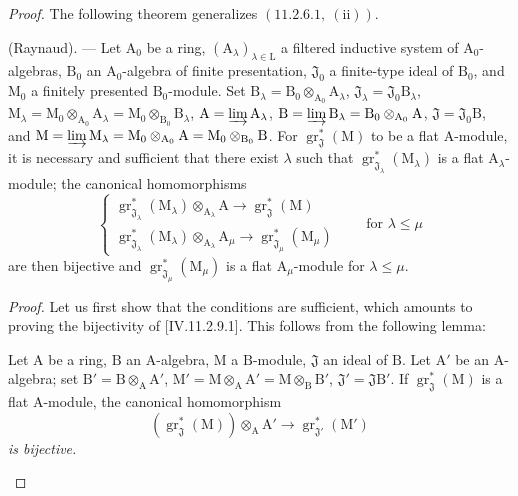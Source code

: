 \begin{proof}
The following theorem generalizes $(11.2.6.1,~(\mathrm{ii}))$.

\begin{theorem}[11.2.9]
\label{IV.11.2.9}
(Raynaud). --- Let $\mathrm{A}_0$ be a ring, $(\mathrm{A}_\lambda)_{\lambda\in\mathrm{L}}$ a filtered inductive system of $\mathrm{A}_0$-algebras, $\mathrm{B}_0$ an $\mathrm{A}_0$-algebra of finite presentation, $\mathfrak{J}_0$ a finite-type ideal of $\mathrm{B}_0$, and $\mathrm{M}_0$ a finitely presented $\mathrm{B}_0$-module. Set $\mathrm{B}_\lambda=\mathrm{B}_0\otimes_{\mathrm{A}_0}\mathrm{A}_\lambda$, $\mathfrak{J}_\lambda=\mathfrak{J}_0\mathrm{B}_\lambda$, $\mathrm{M}_\lambda=\mathrm{M}_0\otimes_{\mathrm{A}_0}\mathrm{A}_\lambda=\mathrm{M}_0\otimes_{\mathrm{B}_0}\mathrm{B}_\lambda$, $\mathrm{A}=\varinjlim\mathrm{A}_\lambda$, $\mathrm{B}=\varinjlim\mathrm{B}_\lambda=\mathrm{B}_0\otimes_{\mathrm{A}_0}\mathrm{A}$, $\mathfrak{J}=\mathfrak{J}_0\mathrm{B}$, and $\mathrm{M}=\varinjlim\mathrm{M}_\lambda=\mathrm{M}_0\otimes_{\mathrm{A}_0}\mathrm{A}=\mathrm{M}_0\otimes_{\mathrm{B}_0}\mathrm{B}$. For $\operatorname{gr}^*_\mathfrak{J}(\mathrm{M})$ to be a flat $\mathrm{A}$-module, it is necessary and sufficient that there exist $\lambda$ such that $\operatorname{gr}^*_{\mathfrak{J}_\lambda}(\mathrm{M}_\lambda)$ is a flat $\mathrm{A}_\lambda$-module; the canonical homomorphisms
\begin{equation}
  \begin{cases}
    \operatorname{gr}^*_{\mathfrak{J}_\lambda}(\mathrm{M}_\lambda)\otimes_{\mathrm{A}_\lambda}\mathrm{A} \to \operatorname{gr}^*_\mathfrak{J}(\mathrm{M}) \\
    \operatorname{gr}^*_{\mathfrak{J}_\lambda}(\mathrm{M}_\lambda)\otimes_{\mathrm{A}_\lambda}\mathrm{A}_\mu \to \operatorname{gr}^*_{\mathfrak{J}_\mu}(\mathrm{M}_\mu)
  \end{cases}
  \qquad\text{for }\lambda\leqslant\mu
  \label{IV.11.2.9.1}
\tag{11.2.9.1}
\end{equation}
are then bijective and $\operatorname{gr}^*_{\mathfrak{J}_\mu}(\mathrm{M}_\mu)$ is a flat $\mathrm{A}_\mu$-module for $\lambda\leqslant\mu$.
\end{theorem}

\medskip
\noindent\emph{Proof.}
Let us first show that the conditions are sufficient, which amounts to proving the bijectivity of [IV.11.2.9.1]. This follows from the following lemma:

\begin{lemma}[11.2.9.2]
\label{IV.11.2.9.2}
Let $\mathrm{A}$ be a ring, $\mathrm{B}$ an $\mathrm{A}$-algebra, $\mathrm{M}$ a $\mathrm{B}$-module, $\mathfrak{J}$ an ideal of $\mathrm{B}$. Let $\mathrm{A}'$ be an $\mathrm{A}$-algebra; set $\mathrm{B}'=\mathrm{B}\otimes_\mathrm{A}\mathrm{A}'$, $\mathrm{M}'=\mathrm{M}\otimes_\mathrm{A}\mathrm{A}'=\mathrm{M}\otimes_\mathrm{B}\mathrm{B}'$, $\mathfrak{J}'=\mathfrak{J}\mathrm{B}'$. If $\operatorname{gr}^*_\mathfrak{J}(\mathrm{M})$ is a flat $\mathrm{A}$-module, the canonical homomorphism
\[
  (\operatorname{gr}^*_\mathfrak{J}(\mathrm{M}))\otimes_\mathrm{A}\mathrm{A}'\to\operatorname{gr}^*_{\mathfrak{J}'}(\mathrm{M}')
\]
\emph{is bijective.}
\end{lemma}


\end{proof}
